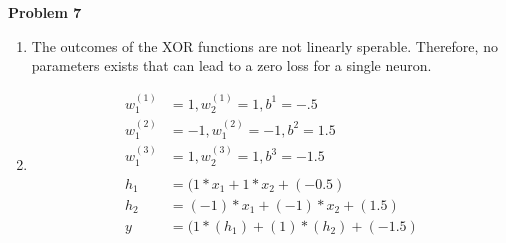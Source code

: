 \documentclass[11pt,letterpaper]{article}
\begin{document}
\textbf{Problem 7}
\begin{enumerate}[labelindent=0pt]
\item 
The outcomes of the XOR functions are not linearly sperable.  Therefore, no
parameters exists that can lead to a zero loss for a single neuron.
\item
	\begin{align*}
	w_{1}^{(1)} & = 1,
	w_{2}^{(1)}  = 1, 
	b^{1}  = -.5 \\
	w_{1}^{(2)} & = -1,
	w_{1}^{(2)}  = -1,
	b^{2}  =1.5 \\
	w_{1}^{(3)} & = 1,
	w_{2}^{(3)}  = 1,
	b^{3}  = -1.5 \\ \\
	h_{1} &= (1*x_{1}+1*x_{2}+(-0.5)\\
	h_{2} &= (-1)*x_{1}+(-1)*x_{2}+(1.5)\\
	y &= (1*(h_{1})+(1)*(h_{2})+(-1.5)\\
	\end{align*}
\end{enumerate}
\end{document}
